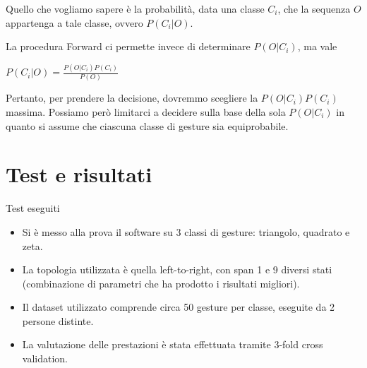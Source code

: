 \documentclass[hyperref={pdfpagelabels=false},slidestop,mathserif,red]{beamer}
\begin{document}
\begin{frame}
\begin{block}{}
 Quello che vogliamo sapere \`e la probabilit\`a, data una classe $C_{i}$, che la sequenza $O$ appartenga a tale classe, ovvero $P(C_{i}|O)$.
\end{block}
\begin{block}{}
 La procedura Forward ci permette invece di determinare $P(O|C_{i})$, ma vale
\begin{center}$P(C_{i}|O) = \frac{P(O|C_{i})P(C_{i})}{P(O)}$\end{center}
\end{block}
\begin{block}{}
 Pertanto, per prendere la decisione, dovremmo scegliere la $P(O|C_{i})P(C_{i})$ massima. Possiamo per\`o limitarci a decidere sulla base della sola $P(O|C_{i})$ in quanto si assume che ciascuna classe di gesture sia equiprobabile.
\end{block}
\end{frame}

\section{Test e risultati}

\begin{frame}{Test eseguiti}
\begin{block}{}
\begin{itemize}
\item Si \`e messo alla prova il software su 3 classi di gesture: triangolo, quadrato e zeta.
\item La topologia utilizzata \`e quella left-to-right, con span 1 e 9 diversi stati (combinazione di parametri che ha prodotto i risultati migliori).
\item Il dataset utilizzato comprende circa 50 gesture per classe, eseguite da 2 persone distinte.
\item La valutazione delle prestazioni \`e stata effettuata tramite 3-fold cross validation.
\end{itemize}

\end{block}
\end{frame}
\end{document}
